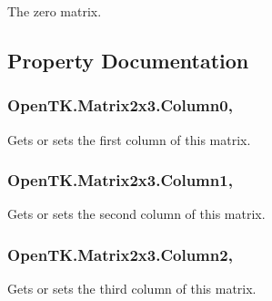 The zero matrix. 



\subsection{Property Documentation}
\hypertarget{struct_open_t_k_1_1_matrix2x3_aceafeeb7b09421f748e8f93621f9340d}{
\subsubsection[{Column0}]{ Open\-T\-K.\-Matrix2x3.\-Column0\hspace{0.3cm}{\ttfamily [get]}, {\ttfamily [set]}}}\label{struct_open_t_k_1_1_matrix2x3_aceafeeb7b09421f748e8f93621f9340d}


Gets or sets the first column of this matrix. 

\hypertarget{struct_open_t_k_1_1_matrix2x3_ac60d92ca637f9d483c07f7904a8be81c}{
\subsubsection[{Column1}]{ Open\-T\-K.\-Matrix2x3.\-Column1\hspace{0.3cm}{\ttfamily [get]}, {\ttfamily [set]}}}\label{struct_open_t_k_1_1_matrix2x3_ac60d92ca637f9d483c07f7904a8be81c}


Gets or sets the second column of this matrix. 

\hypertarget{struct_open_t_k_1_1_matrix2x3_ac93584e4bf0dc5a1bca1cebea3532870}{
\subsubsection[{Column2}]{ Open\-T\-K.\-Matrix2x3.\-Column2\hspace{0.3cm}{\ttfamily [get]}, {\ttfamily [set]}}}\label{struct_open_t_k_1_1_matrix2x3_ac93584e4bf0dc5a1bca1cebea3532870}


Gets or sets the third column of this matrix. 

